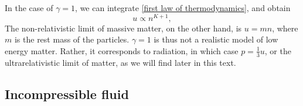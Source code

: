 In the case of $\gamma = 1$, we can integrate \autoref{first law of thermodynamics}, and obtain
%
\begin{equation}
    u \propto n^{K + 1},
\end{equation}
%
The non-relativistic limit of massive matter, on the other hand, is $u = m n$, where $m$ is the rest mass of the particles.
$\gamma = 1$ is thus not a realistic model of low energy matter.
Rather, it corresponds to radiation, in which case $p = \frac{1}{3} u$, or the ultrarelativistic limit of matter, as we will find later in this text.




\subsection{Incompressible fluid}
\label{subsection: incompressible fluid}

